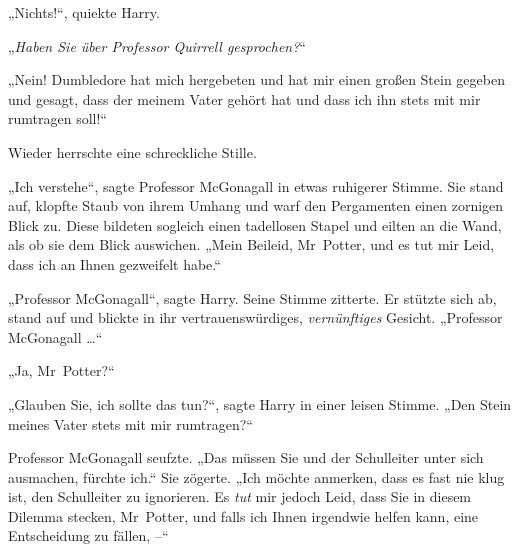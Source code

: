 „Nichts!“, quiekte Harry.

„\emph{Haben Sie über Professor Quirrell gesprochen?}“

„Nein! Dumbledore hat mich hergebeten und hat mir einen großen Stein gegeben und gesagt, dass der meinem Vater gehört hat und dass ich ihn stets mit mir rumtragen soll!“

Wieder herrschte eine schreckliche Stille.

„Ich verstehe“, sagte Professor McGonagall in etwas ruhigerer Stimme. Sie stand auf, klopfte Staub von ihrem Umhang und warf den Pergamenten einen zornigen Blick zu. Diese bildeten sogleich einen tadellosen Stapel und eilten an die Wand, als ob sie dem Blick auswichen. „Mein Beileid, Mr~Potter, und es tut mir Leid, dass ich an Ihnen gezweifelt habe.“

„Professor McGonagall“, sagte Harry. Seine Stimme zitterte. Er stützte sich ab, stand auf und blickte in ihr vertrauenswürdiges, \emph{vernünftiges} Gesicht. „Professor McGonagall …“

„Ja, Mr~Potter?“

„Glauben Sie, ich sollte das tun?“, sagte Harry in einer leisen Stimme. „Den Stein meines Vater stets mit mir rumtragen?“

Professor McGonagall seufzte. „Das müssen Sie und der Schulleiter unter sich ausmachen, fürchte ich.“ Sie zögerte. „Ich möchte anmerken, dass es fast nie klug ist, den Schulleiter zu ignorieren. Es \emph{tut} mir jedoch Leid, dass Sie in diesem Dilemma stecken, Mr~Potter, und falls ich Ihnen irgendwie helfen kann, eine Entscheidung zu fällen, –“

